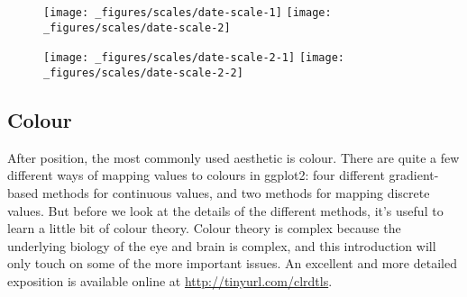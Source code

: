\begin{figure}[H]
  \texttt{[image: \_figures/scales/date-scale-1]}%
  \texttt{[image: \_figures/scales/date-scale-2]}
\end{figure}

\begin{Shaded}
\end{Shaded}

\begin{figure}[H]
  \texttt{[image: \_figures/scales/date-scale-2-1]}%
  \texttt{[image: \_figures/scales/date-scale-2-2]}
\end{figure}

\hypertarget{sub:scale-colour}{%
\subsection{Colour}\label{sub:scale-colour}}

After position, the most commonly used aesthetic is colour. There are
quite a few different ways of mapping values to colours in ggplot2: four
different gradient-based methods for continuous values, and two methods
for mapping discrete values. But before we look at the details of the
different methods, it's useful to learn a little bit of colour theory.
Colour theory is complex because the underlying biology of the eye and
brain is complex, and this introduction will only touch on some of the
more important issues. An excellent and more detailed exposition is
available online at \url{http://tinyurl.com/clrdtls}. 

